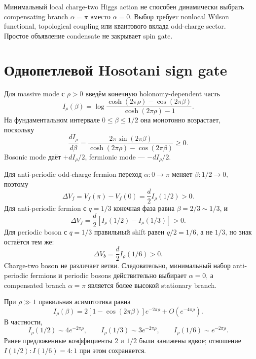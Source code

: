 \begin{nogocriterion}
Минимальный local charge-two Higgs action не способен динамически выбрать
compensating branch \(\alpha=\pi\) вместо \(\alpha=0\). Выбор требует
nonlocal Wilson functional, topological coupling или квантового вклада
odd-charge sector. Простое объявление condensate не закрывает spin gate.
\end{nogocriterion}

\section{Однопетлевой Hosotani sign gate}

Для massive mode с \(\rho>0\) введём конечную holonomy-dependent часть
\begin{equation}
 I_\rho(\beta)=
 \log\frac{\cosh(2\pi\rho)-\cos(2\pi\beta)}
 {\cosh(2\pi\rho)-1}.
\end{equation}
На фундаментальном интервале \(0\leq\beta\leq1/2\) она монотонно возрастает,
поскольку
\begin{equation}
 \frac{dI_\rho}{d\beta}
 =\frac{2\pi\sin(2\pi\beta)}
 {\cosh(2\pi\rho)-\cos(2\pi\beta)}\geq0.
\end{equation}
Bosonic mode даёт \(+dI_\rho/2\), fermionic mode --- \(-dI_\rho/2\).

Для anti-periodic odd-charge fermion переход \(\alpha:0\to\pi\) меняет
\(\beta:1/2\to0\), поэтому
\begin{equation}
 \Delta V_f
 =V_f(\pi)-V_f(0)
 =\frac d2 I_\rho(1/2)>0.
\end{equation}
Для anti-periodic fermion с \(q=1/3\) конечная фаза равна
\(\beta=2/3\sim1/3\), и
\begin{equation}
 \Delta V_f
 =\frac d2\left[I_\rho(1/2)-I_\rho(1/3)\right]>0.
\end{equation}
Для periodic boson с \(q=1/3\) правильный shift равен \(q/2=1/6\), а не
\(1/3\), но знак остаётся тем же:
\begin{equation}
 \Delta V_b=\frac d2I_\rho(1/6)>0.
\end{equation}
Charge-two boson не различает ветви. Следовательно, минимальный набор
anti-periodic fermions и periodic bosons действительно выбирает
\(\alpha=0\), а compensated branch \(\alpha=\pi\) является более высокой
stationary branch.

При \(\rho\gg1\) правильная асимптотика равна
\begin{equation}
 I_\rho(\beta)
 =2\left[1-\cos(2\pi\beta)\right]e^{-2\pi\rho}
 +O(e^{-4\pi\rho}).
\end{equation}
В частности,
\begin{equation}
 I_\rho(1/2)\sim4e^{-2\pi\rho},
 \qquad
 I_\rho(1/3)\sim3e^{-2\pi\rho},
 \qquad
 I_\rho(1/6)\sim e^{-2\pi\rho}.
\end{equation}
Ранее предложенные коэффициенты \(2\) и \(1/2\) были занижены вдвое;
отношение \(I(1/2):I(1/6)=4:1\) при этом сохраняется.

